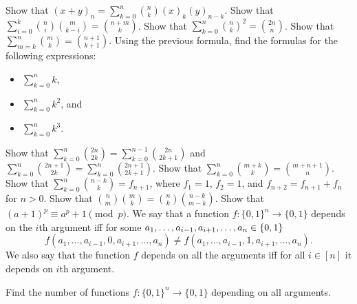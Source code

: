 \begin{chapterendexercises}
  \exercise Show that
    $(x + y)_n = \sum_{k = 0}^n \binom{n}{k} (x)_k (y)_{n - k}$.
  \exercise Show that
    $\sum_{i = 0}^k \binom{n}{i} \binom{m}{k - i} = \binom{n + m}{k}$.
  \exercise Show that
    $\sum_{k = 0}^n \binom{n}{k}^2 = \binom{2n}{n}$.
  \exercise Show that $\sum_{m = k}^n \binom{m}{k} =
    \binom{n + 1}{k + 1}$.
  \exercise Using the previous formula, find the formulas for the following
    expressions:
    \begin{itemize}
      \item $\sum_{k = 0}^n k$,
      \item $\sum_{k = 0}^n k^2$, and
      \item $\sum_{k = 0}^n k^3$.
    \end{itemize}
  \exercise Show that $\sum_{k = 0}^{n} \binom{2n}{2k} =
    \sum_{k = 0}^{n - 1} \binom{2n}{2k + 1}$ and
    $\sum_{k = 0}^{n} \binom{2n + 1}{2k} =
    \sum_{k = 0}^n \binom{2n + 1}{2k + 1}$.
  \exercise Show that $\sum_{k = 0}^n \binom{m + k}{k} =
    \binom{m + n + 1}{n}$.
  \exercise Show that $\sum_{k = 0}^n \binom{n - k}{k} = f_{n + 1}$,
    where $f_1 = 1$, $f_2 = 1$, and $f_{n + 2} = f_{n + 1} + f_n$ for $n > 0$.
  \exercise Show that $\binom{n}{m} \binom{m}{k} =
    \binom{n}{k} \binom{n - k}{m - k}$.
  \exercise Show that
    $(a + 1)^p \equiv a^p + 1 \pmod{p}$.
  \exercise We say that a function $f : \{0, 1\}^n \to \{0, 1\}$ depends on the
    $i$th argument iff for some
    $a_1, \dots, a_{i - 1}, a_{i + 1}, \dots, a_n \in \set{0, 1}$
    \[
      f(a_1, \dots, a_{i - 1}, 0, a_{i + 1}, \dots, a_n) \neq
      f(a_1, \dots, a_{i - 1}, 1, a_{i + 1}, \dots, a_n).
    \]
    We also say that the function $f$ depends on all the arguments iff for all $i
    \in [n]$ it depends on $i$th argument.

    Find the number of functions $f : \{0, 1\}^n \to \{0, 1\}$ depending on all
    arguments.
\end{chapterendexercises}
